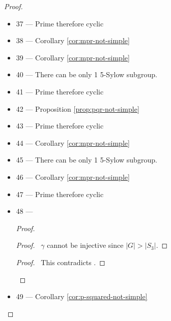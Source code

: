 \begin{proof}
\begin{itemize}
\begin{proof}
	\begin{proof}
		\pf\ $\gamma$ cannot be injective since $|G| > |S_4|$.
	\end{proof}
	\qedstep
	\begin{proof}
		\pf\ This contradicts .
	\end{proof}
\end{proof}
\item 37 --- Prime therefore cyclic
\item 38 --- Corollary \ref{cor:mpr-not-simple}
\item 39 --- Corollary \ref{cor:mpr-not-simple}
\item 40 --- There can be only 1 5-Sylow subgroup.
\item 41 --- Prime therefore cyclic
\item 42 --- Proposition \ref{prop:pqr-not-simple} 
\item 43 --- Prime therefore cyclic
\item 44 --- Corollary \ref{cor:mpr-not-simple}
\item 45 --- There can be only 1 5-Sylow subgroup.
\item 46 --- Corollary \ref{cor:mpr-not-simple}
\item 47 --- Prime therefore cyclic
\item 48 ---
\begin{proof}
	\begin{proof}
		\pf\ $\gamma$ cannot be injective since $|G| > |S_3|$.
	\end{proof}
	\qedstep
	\begin{proof}
		\pf\ This contradicts .
	\end{proof}
\end{proof}
\item 49 --- Corollary \ref{cor:p-squared-not-simple}

\end{itemize}
\end{proof}
